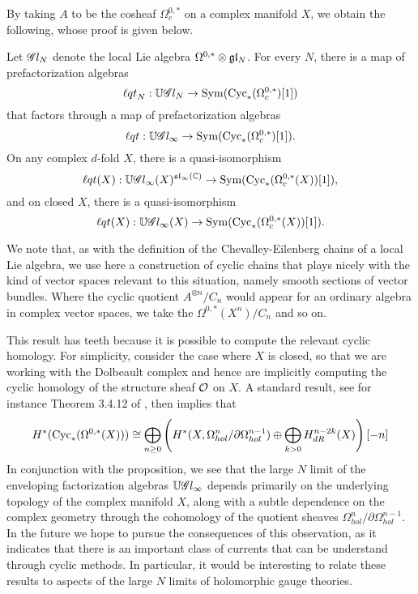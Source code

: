 By taking $A$ to be the cosheaf $\Omega^{0,*}_c$ on a complex manifold $X$,
we obtain the following, whose proof is given below. 

\begin{prop}
\label{prop: cycfact}
Let $\mathscr G l_N$ denote the local Lie algebra $\Omega^{0,*} \otimes \mathfrak{g} \mathfrak{l}_N$.
For every $N$, there is a map of prefactorization algebras
\[
{\ell q t}_N: \mathbb U \mathscr G l_N \to {\rm Sym}({\rm Cyc}_*(\Omega^{0,*}_c)[1])
\]
that factors through a map of prefactorization algebras
\[
{\ell q t}: \mathbb U \mathscr G l_\infty \to {\rm Sym}({\rm Cyc}_*(\Omega^{0,*}_c)[1]).
\]
On any complex $d$-fold $X$, there is a quasi-isomorphism
\[
{\ell q t}(X): \mathbb U \mathscr G l_\infty(X)^{\mathfrak{sl}_\infty(\mathbb C)} \to {\rm Sym}({\rm Cyc}_*(\Omega^{0,*}_c(X))[1]),
\]
and on closed $X$, there is a quasi-isomorphism
\[
{\ell q t}(X): \mathbb U \mathscr G l_\infty(X) \to {\rm Sym}({\rm Cyc}_*(\Omega^{0,*}_c(X))[1]).
\]
\end{prop}

\begin{rmk}
We note that, as with the definition of the Chevalley-Eilenberg chains of a local Lie algebra,
we use here a construction of cyclic chains that plays nicely with the kind of vector spaces relevant to this situation,
namely smooth sections of vector bundles.
Where the cyclic quotient $A^{\otimes n}/C_n$ would appear for an ordinary algebra in complex vector spaces,
we take the $\Omega^{0,*}(X^n)/C_n$ and so on.
\end{rmk}


This result has teeth because it is possible to compute the relevant cyclic homology.
For simplicity, consider the case where $X$ is closed, 
so that we are working with the Dolbeault complex and hence are implicitly computing the cyclic homology of the structure sheaf $\mathcal O$ on $X$.
A standard result, see for instance Theorem 3.4.12 of \cite{LodayCyclic}, then implies that
\[
H^*({\rm Cyc}_*(\Omega^{0,*}(X))) \cong \bigoplus_{n \geq 0} \left( H^*(X, \Omega^n_{hol}/\partial \Omega^{n-1}_{hol}) \oplus \bigoplus_{k > 0} H^{n-2k}_{dR}(X) \right)[-n]
\]
In conjunction with the proposition, we see that the large $N$ limit of the enveloping factorization algebras $\mathbb U \mathscr G l_\infty$ depends primarily on the underlying topology of the complex manifold $X$, 
along with a subtle dependence on the complex geometry through the cohomology of the quotient sheaves $\Omega^n_{hol}/\partial \Omega^{n-1}_{hol}$.
In the future we hope to pursue the consequences of this observation, 
as it indicates that there is an important class of currents that can be understand through cyclic methods.
In particular, it would be interesting to relate these results to aspects of the large $N$ limits of holomorphic gauge theories.

